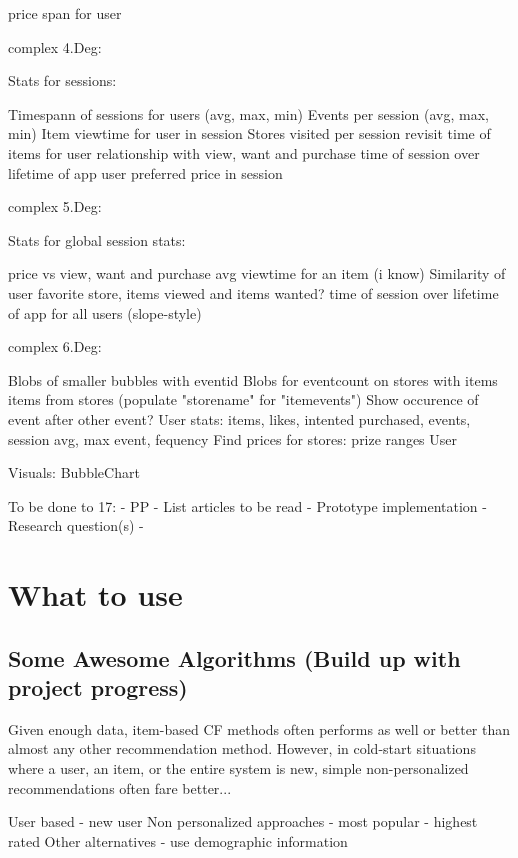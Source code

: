         price span for user

    complex 4.Deg:

        Stats for sessions:

            Timespann of sessions for users (avg, max, min)
            Events per session (avg, max, min)
            Item viewtime for user in session
            Stores visited per session
            revisit time of items for user
            relationship with view, want and purchase
            time of session over lifetime of app
            user preferred price in session

    complex 5.Deg:

        Stats for global session stats:

            price vs view, want and purchase
            avg viewtime for an item (i know)
            Similarity of user favorite store, items viewed and items wanted?
            time of session over lifetime of app for all users (slope-style)

    complex 6.Deg:

    Blobs of smaller bubbles with eventid
    Blobs for eventcount on stores with items items from stores (populate "storename" for "itemevents")
    Show occurence of event after other event?
    User stats: items, likes, intented purchased, events, session avg, max event, fequency
    Find prices for stores: prize ranges
    User

Visuals:
    BubbleChart

To be done to 17:
    - PP
    - List articles to be read
    - Prototype implementation
    - Research question(s)
    -


\section{What to use}


%
\subsection{Some Awesome Algorithms (Build up with project progress)}

Given enough data, item-based CF methods often performs as well or better than almost any other recommendation method. However, in cold-start situations where a user, an item, or the entire system is new, simple non-personalized recommendations often fare better...

User based - new user
Non personalized approaches
	- most popular
	- highest rated
Other alternatives
	- use demographic information

